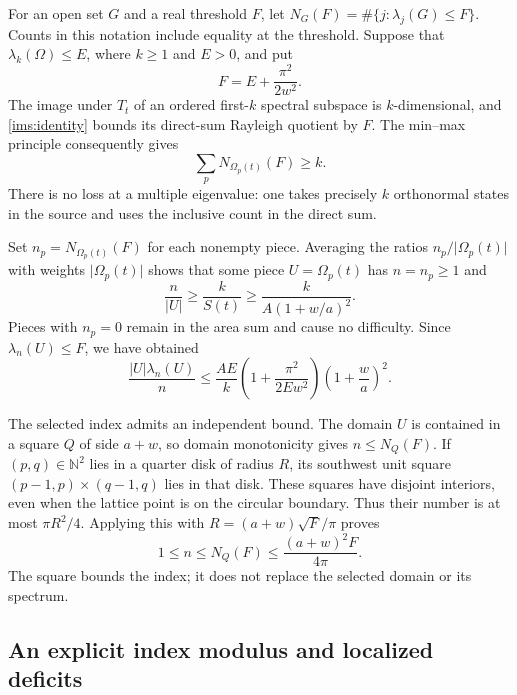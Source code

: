 \documentclass[11pt,reqno]{amsart}
\numberwithin{equation}{section}
\newcommand{\N}{\mathbb N}
\newcommand{\abs}[1]{\lvert#1\rvert}
\newcommand{\Om}{\Omega}
\begin{document}
For an open set $G$ and a real threshold $F$, let
$N_G(F)=\#\{j:\lambda_j(G)\leq F\}$.  Counts in this notation
include equality at the threshold.  Suppose that
$\lambda_k(\Om)\leq E$, where $k\geq1$ and $E>0$, and put
\[
 F=E+\frac{\pi^2}{2w^2}.
\]
The image under $T_t$ of an ordered first-$k$ spectral subspace
is $k$-dimensional, and \eqref{ims:identity} bounds its direct-sum
Rayleigh quotient by $F$.  The min--max principle consequently gives
\begin{equation}
 \sum_p N_{\Om_p(t)}(F)\geq k.
 \label{ims:inclusive-count}
\end{equation}
There is no loss at a multiple eigenvalue: one takes precisely $k$
orthonormal states in the source and uses the inclusive count in
the direct sum.

Set $n_p=N_{\Om_p(t)}(F)$ for each nonempty piece.  Averaging
the ratios $n_p/\abs{\Om_p(t)}$ with weights
$\abs{\Om_p(t)}$ shows that some piece $U=\Om_p(t)$ has
$n=n_p\geq1$ and
\[
 \frac{n}{\abs U}\geq\frac{k}{S(t)}
       \geq\frac{k}{A(1+w/a)^2}.
\]
Pieces with $n_p=0$ remain in the area sum and cause no difficulty.
Since $\lambda_n(U)\leq F$, we have obtained
\begin{equation}
 \frac{\abs U\lambda_n(U)}n
 \leq\frac{AE}{k}
       \left(1+\frac{\pi^2}{2Ew^2}\right)
       \left(1+\frac wa\right)^2.
 \label{ims:window-ratio}
\end{equation}

The selected index admits an independent bound.  The domain $U$
is contained in a square $Q$ of side $a+w$, so domain monotonicity
gives $n\leq N_Q(F)$.  If $(p,q)\in\N^2$ lies in a quarter disk
of radius $R$, its southwest unit square
$(p-1,p)\times(q-1,q)$ lies in that disk.  These squares have
disjoint interiors, even when the lattice point is on the circular
boundary.  Thus their number is at most $\pi R^2/4$.  Applying this
with $R=(a+w)\sqrt F/\pi$ proves
\begin{equation}
 1\leq n\leq N_Q(F)
       \leq\frac{(a+w)^2F}{4\pi}.
 \label{ims:local-index}
\end{equation}
The square bounds the index; it does not replace the selected
domain or its spectrum.

\subsection{An explicit index modulus and localized deficits}
\label{ims:modulus-section}
\end{document}
